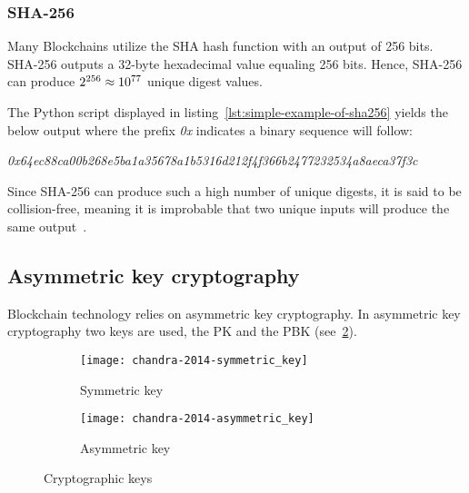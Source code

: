\subsubsection{SHA-256}
Many \glspl{Blockchain} utilize the \gls{SHA} hash function with an output of 256 bits.
SHA-256 outputs a 32-byte hexadecimal value equaling 256 bits.
Hence, SHA-256 can produce \begin{math}2\textsuperscript{256}\approx10\textsuperscript{77}\end{math} unique digest values.


The Python script displayed in listing~\ref{lst:simple-example-of-sha256} yields the below output where the prefix \emph{0x} indicates a binary sequence will follow:

\smallskip
\begingroup\small\emph{0x64ec88ca00b268e5ba1a35678a1b5316d212f4f366b2477232534a8aeca37f3c}\endgroup
\smallskip

Since SHA-256 can produce such a high number of unique digests, it is said to be collision-free, meaning it is improbable that two unique inputs will produce the same output~\autocite[8]{yaga_blockchain_2018}.

\subsection{Asymmetric key cryptography}\label{subsec:asymmetric-key-cryptography}

\Gls{Blockchain} technology relies on asymmetric key cryptography.
In asymmetric key cryptography two keys are used, the \gls{PK} and the \gls{PBK} (see~\cref{fig:asymmetric-key}).

\begin{figure}[H]
    \begin{subfigure}[b]{\textwidth}
        \centering
        \texttt{[image: chandra-2014-symmetric\_key]}
        \caption{Symmetric key}
        \label{fig:symmetric-key}
    \end{subfigure}
    \begin{subfigure}[b]{\textwidth}
        \centering
        \texttt{[image: chandra-2014-asymmetric\_key]}
        \caption{Asymmetric key}
        \label{fig:asymmetric-key}
    \end{subfigure}
    \caption[Cryptographic keys]{Cryptographic keys~\autocite[84]{chandra_comparative_2014}}\label{fig:cryptographic-keys}
\end{figure}


